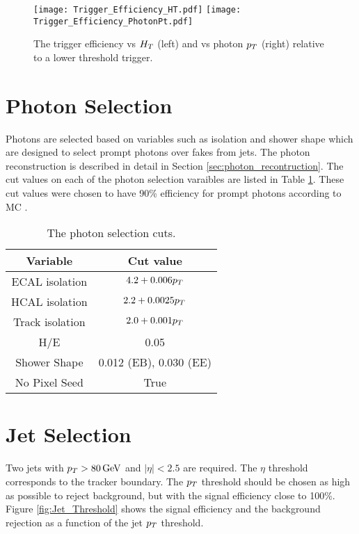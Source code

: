 \begin{figure}
\texttt{[image: Trigger\_Efficiency\_HT.pdf]}
\texttt{[image: Trigger\_Efficiency\_PhotonPt.pdf]}
\caption{The trigger efficiency vs $H_{T}$ (left) and vs photon $p_{T}$ (right)
relative to a lower threshold trigger.}
\label{fig:Trigger_Efficiency}
\end{figure}

\section{Photon Selection}

Photons are selected based on variables such as isolation and shower shape which
are designed to select prompt photons over fakes from jets. The photon 
reconstruction is described in detail in Section \ref{sec:photon_recontruction}. 
The cut values on each of the photon selection varaibles are listed in Table 
\ref{tab:photoncuts}. These cut values were chosen to have 90\unit{\%} efficiency
for prompt photons according to MC \cite{photon_cuts}.

\begin{table}
\begin{center}
\begin{tabular}{|c|c|}
\hline
Variable & Cut value \\
\hline
ECAL isolation & $4.2 + 0.006p_{T}$ \\
HCAL isolation & $2.2 + 0.0025p_{T}$ \\
Track isolation & $2.0 + 0.001p_{T}$ \\
H/E & 0.05 \\
Shower Shape & 0.012 (EB), 0.030 (EE) \\
No Pixel Seed & True \\
\hline
\end{tabular}
\end{center}
\caption{The photon selection cuts.}
\label{tab:photoncuts}
\end{table}

\section{Jet Selection}

Two jets with $p_{T} > 80 \, \mathrm{GeV}$ and $|\eta| < 2.5$ are required. The $\eta$
threshold corresponds to the tracker boundary. The $p_{T}$ threshold should be
chosen as high as possible to reject background, but with the signal efficiency
close to 100\%. Figure \ref{fig:Jet_Threshold} shows the signal efficiency and 
the background rejection as a function of the jet $p_{T}$ threshold. 

